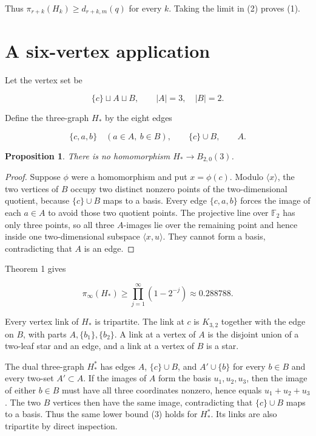 \documentclass[11pt]{article}
\newtheorem{proposition}{Proposition}
\numberwithin{equation}{section}
\begin{document}
Thus $\pi_{r+k}(H_k)\geq d_{r+k,m}(q)$ for every $k$. Taking the limit in (2) proves (1).

\section{A six-vertex application}


Let the vertex set be

\[
\{c\}\sqcup A\sqcup B,\qquad |A|=3,\quad |B|=2.
\]

Define the three-graph $H_*$ by the eight edges

\[
\{c,a,b\}\quad(a\in A,\ b\in B),\qquad \{c\}\cup B,\qquad A.
\]

\begin{proposition}


There is no homomorphism $H_*\to B_{2,0}(3)$.

\end{proposition}

\begin{proof}


Suppose $\phi$ were a homomorphism and put $x=\phi(c)$. Modulo $\langle x\rangle$, the two
vertices of $B$ occupy two distinct nonzero points of the two-dimensional quotient, because
$\{c\}\cup B$ maps to a basis. Every edge $\{c,a,b\}$ forces the image of each $a\in A$ to avoid
those two quotient points. The projective line over $\mathbb F_2$ has only three points, so all
three $A$-images lie over the remaining point and hence inside one two-dimensional subspace
$\langle x,u\rangle$. They cannot form a basis, contradicting that $A$ is an edge.
\end{proof}


Theorem 1 gives

\[
\pi_\infty(H_*)\geq\prod_{j=1}^{\infty}(1-2^{-j})\approx0.288788.
\tag{3}
\]

Every vertex link of $H_*$ is tripartite. The link at $c$ is $K_{3,2}$ together with the edge on
$B$, with parts $A,\{b_1\},\{b_2\}$. A link at a vertex of $A$ is the disjoint union of a
two-leaf star and an edge, and a link at a vertex of $B$ is a star.

The dual three-graph $H_*^*$ has edges $A$, $\{c\}\cup B$, and
$A'\cup\{b\}$ for every $b\in B$ and every two-set $A'\subset A$. If the images of $A$ form the
basis $u_1,u_2,u_3$, then the image of either $b\in B$ must have all three coordinates nonzero,
hence equals $u_1+u_2+u_3$. The two $B$ vertices then have the same image, contradicting that
$\{c\}\cup B$ maps to a basis. Thus the same lower bound (3) holds for $H_*^*$. Its links are
also tripartite by direct inspection.
\end{document}
